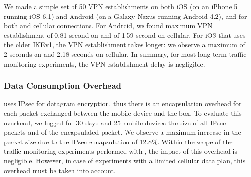 We made a simple set of 50 VPN establishments on both iOS (on an
iPhone 5 running iOS 6.1) and Android (on a Galaxy Nexus running
Android 4.2), and for both \wifi{} and cellular connections. For
Android, we found maximum VPN establishment of 0.81 second on \wifi{}
and of 1.59 second on cellular. For iOS that uses the older IKEv1, the
VPN establishment takes longer: we observe a maximum of 2 seconds on
\wifi{} and 2.18 seconds on cellular.  In summary, for most long term
traffic monitoring experiments, the VPN establishment delay is
negligible.




\subsubsection{Data Consumption Overhead}
\platname{} uses IPsec for datagram encryption, thus there is
an encapsulation overhead for each packet exchanged between the mobile
device and the \platname{} box. To evaluate this overhead, we logged
for 30 days and 25 mobile devices the size of all IPsec packets and of
the encapsulated packet. We observe a maximum increase in the packet
size due to the IPsec encapsulation of 12.8\%. Within the scope of the
traffic monitoring experiments performed with \platname{}, the impact
of this overhead is negligible. However, in case of experiments with a
limited cellular data plan, this overhead must be taken into account. 


